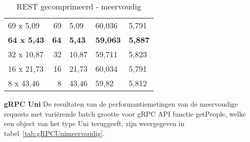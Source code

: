 \begin{table}
\begin{tabular}{lrlll}
        69 x 5,09 & 69 & 5,09 & 60,036 & 5,791 \\
        \textbf{64 x 5,43} & \textbf{64} & \textbf{5,43} & \textbf{59,063} & \textbf{5,887} \\
        32 x 10,87 & 32 & 10,87 & 59,711 & 5,823 \\
        16 x 21,73 & 16 & 21,73 & 60,034 & 5,791 \\
        8 x 43,46 & 8 & 43,46 & 59,82 & 5,812 \\
        \bottomrule
    \end{tabular}
    \caption{REST gecomprimeerd - meervoudig}
    \label{tab:RESTcompressiemeervoudig}
\end{table}

\textbf{gRPC Uni}\newline
De resultaten van de performantiemetingen van de meervoudige requests met vari\"erende batch grootte voor gRPC API functie getPeople, welke een object van het type Uni teruggeeft, zijn
weergegeven in tabel~\ref{tab:gRPCUnimeervoudig}.

